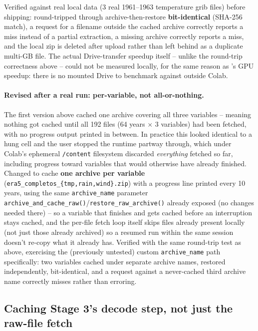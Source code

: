 \documentclass[11pt]{article}
\begin{document}
Verified against real local data (3 real 1961--1963 temperature grib
files) before shipping: round-tripped through archive-then-restore
\textbf{bit-identical} (SHA-256 match), a request for a filename outside
the cached archive correctly reports a miss instead of a partial
extraction, a missing archive correctly reports a miss, and the local zip
is deleted after upload rather than left behind as a duplicate multi-GB
file. The actual Drive-transfer speedup itself -- unlike the round-trip
correctness above -- could not be measured locally, for the same reason
as 's GPU speedup: there is no mounted Drive to benchmark
against outside Colab.

\paragraph{Revised after a real run: per-variable, not all-or-nothing.}
The first version above cached one archive covering all three variables
-- meaning nothing got cached until all 192 files (64 years $\times$ 3
variables) had been fetched, with no progress output printed in between.
In practice this looked identical to a hung cell and the user stopped the
runtime partway through, which under Colab's ephemeral \texttt{/content}
filesystem discarded \emph{everything} fetched so far, including
progress toward variables that would otherwise have already finished.
Changed to cache \textbf{one archive per variable}
(\texttt{era5\_completos\_\{tmp,rain,wind\}.zip}) with a progress line
printed every 10 years, using the same \texttt{archive\_name} parameter
\texttt{archive\_and\_cache\_raw()}/\texttt{restore\_raw\_archive()}
already exposed (no changes needed there) -- so a variable that finishes
and gets cached before an interruption stays cached, and the per-file
fetch loop itself skips files already present locally (not just those
already archived) so a resumed run within the same session doesn't
re-copy what it already has. Verified with the same round-trip test as
above, exercising the (previously untested) custom \texttt{archive\_name}
path specifically: two variables cached under separate archive names,
restored independently, bit-identical, and a request against a
never-cached third archive name correctly misses rather than erroring.

\subsection{Caching Stage 3's decode step, not just the raw-file fetch}
\label{sec:decoded-hourly-cache}
\end{document}
